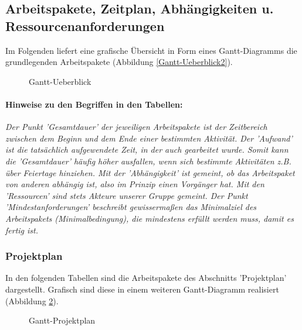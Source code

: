 \documentclass[fontsize=12pt,paper=a4,twoside]{scrartcl}
\begin{document}
\subsection{Arbeitspakete, Zeitplan, Abhängigkeiten u. Ressourcenanforderungen}\label{aps}

Im Folgenden liefert eine grafische Übersicht in Form eines Gantt-Diagramms die grundlegenden Arbeitspakete (Abbildung \ref{Gantt-Ueberblick2}).\\

\begin{figure}[!h]
\caption{Gantt-Ueberblick}
\label{Gantt-Ueberblick}
\end{figure}

\newpage

\paragraph{Hinweise zu den Begriffen in den Tabellen:} \textit{Der Punkt 'Gesamtdauer' der jeweiligen Arbeitspakete ist der Zeitbereich zwischen dem Beginn und dem Ende einer bestimmten Aktivität. Der 'Aufwand' ist die tatsächlich aufgewendete Zeit, in der auch gearbeitet wurde. Somit kann die 'Gesamtdauer' häufig höher ausfallen, wenn sich bestimmte Aktivitäten z.B. über Feiertage hinziehen. Mit der 'Abhängigkeit' ist gemeint, ob das Arbeitspaket von anderen abhängig ist, also im Prinzip einen Vorgänger hat. Mit den 'Ressourcen' sind stets Akteure unserer Gruppe gemeint. Der Punkt 'Mindestanforderungen' beschreibt gewissermaßen das Minimalziel des Arbeitspakets (Minimalbedingung), die mindestens erfüllt werden muss, damit es fertig ist.}\\

\subsubsection{Projektplan}\label{aps}

In den folgenden Tabellen sind die Arbeitspakete des Abschnitts 'Projektplan' dargestellt. Grafisch sind diese in einem weiteren Gantt-Diagramm realisiert (Abbildung \ref{Gantt-Projektplan2}). \\

\begin{figure}[htbp]
\caption{Gantt-Projektplan}

\label{Gantt-Projektplan2}
\end{figure}
\end{document}
